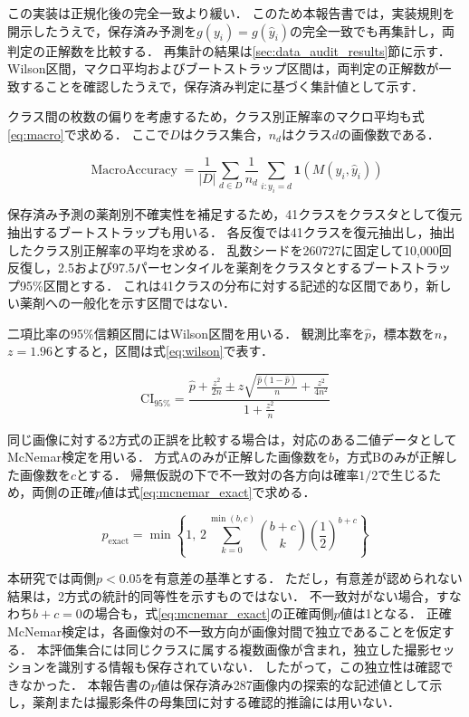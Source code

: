 \documentclass[uplatex,dvipdfmx]{jsarticle}
\begin{document}
この実装は正規化後の完全一致より緩い．
このため本報告書では，実装規則を開示したうえで，保存済み予測を$g(y_i)=g(\hat{y}_i)$の完全一致でも再集計し，両判定の正解数を比較する．
再集計の結果は\ref{sec:data_audit_results}節に示す．
Wilson区間，マクロ平均およびブートストラップ区間は，両判定の正解数が一致することを確認したうえで，保存済み判定に基づく集計値として示す．

クラス間の枚数の偏りを考慮するため，クラス別正解率のマクロ平均も式\eqref{eq:macro}で求める．
ここで$D$はクラス集合，$n_d$はクラス$d$の画像数である．

\begin{equation}
  \operatorname{MacroAccuracy}
  =
  \frac{1}{|D|}
  \sum_{d \in D}
  \frac{1}{n_d}
  \sum_{i : y_i = d}
  \mathbf{1}\!\left(M(y_i,\hat{y}_i)\right)
  \label{eq:macro}
\end{equation}

保存済み予測の薬剤別不確実性を補足するため，41クラスをクラスタとして復元抽出するブートストラップも用いる．
各反復では41クラスを復元抽出し，抽出したクラス別正解率の平均を求める．
乱数シードを260727に固定して10,000回反復し，2.5および97.5パーセンタイルを薬剤をクラスタとするブートストラップ95\%区間とする．
これは41クラスの分布に対する記述的な区間であり，新しい薬剤への一般化を示す区間ではない．

二項比率の95\%信頼区間にはWilson区間を用いる．
観測比率を$\hat{p}$，標本数を$n$，$z=1.96$とすると，区間は式\eqref{eq:wilson}で表す．

\begin{equation}
  \mathrm{CI}_{95\%}
  =
  \frac{
    \hat{p}+\frac{z^2}{2n}
    \pm
    z\sqrt{\frac{\hat{p}(1-\hat{p})}{n}+\frac{z^2}{4n^2}}
  }{
    1+\frac{z^2}{n}
  }
  \label{eq:wilson}
\end{equation}

同じ画像に対する2方式の正誤を比較する場合は，対応のある二値データとしてMcNemar検定を用いる．
方式Aのみが正解した画像数を$b$，方式Bのみが正解した画像数を$c$とする．
帰無仮説の下で不一致対の各方向は確率$1/2$で生じるため，両側の正確$p$値は式\eqref{eq:mcnemar_exact}で求める．

\begin{equation}
  p_{\mathrm{exact}}
  =
  \min\!\left\{
    1,\,
    2\sum_{k=0}^{\min(b,c)}
    \binom{b+c}{k}
    \left(\frac{1}{2}\right)^{b+c}
  \right\}
  \label{eq:mcnemar_exact}
\end{equation}

本研究では両側$p<0.05$を有意差の基準とする．
ただし，有意差が認められない結果は，2方式の統計的同等性を示すものではない．
不一致対がない場合，すなわち$b+c=0$の場合も，式\eqref{eq:mcnemar_exact}の正確両側$p$値は1となる．
正確McNemar検定は，各画像対の不一致方向が画像対間で独立であることを仮定する．
本評価集合には同じクラスに属する複数画像が含まれ，独立した撮影セッションを識別する情報も保存されていない．
したがって，この独立性は確認できなかった．
本報告書の$p$値は保存済み287画像内の探索的な記述値として示し，薬剤または撮影条件の母集団に対する確認的推論には用いない．
\end{document}
